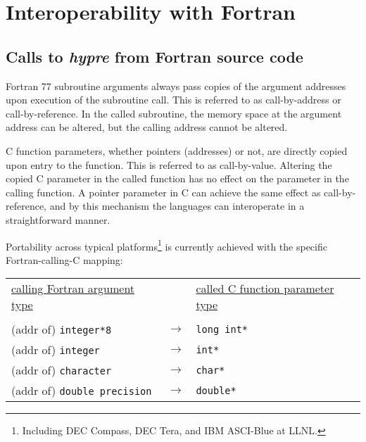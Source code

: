 \chapter{Interoperability with Fortran}

\section{Calls to {\slshape hypre} from Fortran source code}

Fortran 77 subroutine arguments always pass copies of the argument addresses
upon execution of the subroutine call.
This is referred to as call-by-address or call-by-reference.
In the called subroutine, the memory space at the
argument address can be altered, but the calling address cannot be
altered.

C function parameters, whether pointers (addresses) or not, are
directly copied upon
entry to the function. This is referred to as call-by-value.
Altering the copied C parameter in the
called function has no effect on the parameter in the calling function. 
A pointer parameter in C can achieve the same effect as call-by-reference,
and by this mechanism the languages can interoperate in a straightforward
manner.

Portability across typical platforms\footnote{Including DEC Compass, DEC Tera, and IBM ASCI-Blue at LLNL.}
is currently achieved with the specific Fortran-calling-C mapping: 

\vspace{0.2in}

\begin{tabular}{lcl}

\underline{calling Fortran argument type} & &
\underline{called C function parameter type} \\
                              &                   &   \\
\hspace{0.1in} (addr of) \verb+integer*8+        & $\longrightarrow$ &
\hspace{0.5in} \verb+long int*+ \\
\hspace{0.1in} (addr of) \verb+integer+          & $\longrightarrow$ &
\hspace{0.5in} \verb+int*+ \\
\hspace{0.1in} (addr of) \verb+character+        & $\longrightarrow$ &
\hspace{0.5in} \verb+char*+ \\
\hspace{0.1in} (addr of) \verb+double precision+ & $\longrightarrow$ &
\hspace{0.5in} \verb+double*+ \\

\end{tabular}

